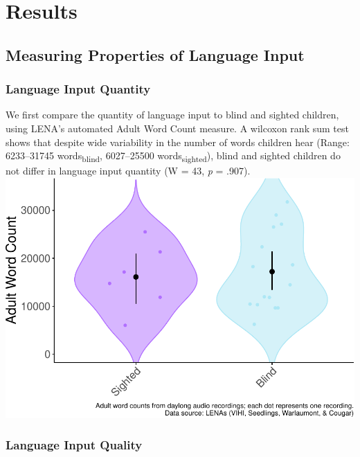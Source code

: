 \documentclass[english,man]{apa6}
\begin{document}
\hypertarget{results}{%
\section{Results}\label{results}}

\hypertarget{measuring-properties-of-language-input}{%
\subsection{Measuring Properties of Language Input}\label{measuring-properties-of-language-input}}

\hypertarget{language-input-quantity}{%
\subsubsection{Language Input Quantity}\label{language-input-quantity}}

We first compare the quantity of language input to blind and sighted children, using LENA's automated Adult Word Count measure. A wilcoxon rank sum test shows that despite wide variability in the number of words children hear (Range: 6233--31745 words\textsubscript{blind}, 6027--25500 words\textsubscript{sighted}), blind and sighted children do not differ in language input quantity (W = 43, \emph{p} = .907).
\includegraphics{input_quality_manuscript_files/figure-latex/AWC-plot-1.pdf}

\hypertarget{language-input-quality}{%
\subsubsection{Language Input Quality}\label{language-input-quality}}
\end{document}

